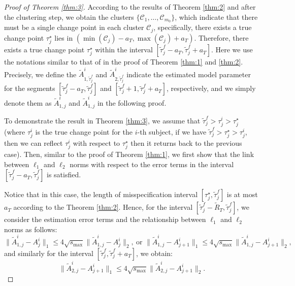 \documentclass[11pt]{article}
\begin{document}
\begin{proof}[Proof of Theorem \ref{thm:3}]
According to the results of Theorem \ref{thm:2} and after the clustering step, we obtain the clusters $\{\mathcal{C}_1, \dots, \mathcal{C}_{m_0}\}$, which indicate that there must be a single change point in each cluster $\mathcal{C}_j$, specifically, there exists a true change point $\tau_j^\star$ lies in $(\min(\mathcal{C}_j) -a_T, \max(\mathcal{C}_j) + a_T)$. Therefore, there exists a true change point $\tau_j^\star$ within the interval $[\widetilde{\tau}_j^f - a_T, \widetilde{\tau}_j^f+a_T]$. Here we use the notations similar to that of in the proof of Theorem \ref{thm:1} and \ref{thm:2}. Precisely, we define the $\widetilde{A}^i_{1,\widetilde{\tau}^f_j}$ and $\widetilde{A}^i_{2,\widetilde{\tau}^f_j}$ indicate the estimated model parameter for the segments $[\widetilde{\tau}^{f}_j-a_T, \widetilde{\tau}^{f}_j]$ and $[\widetilde{\tau}^{f}_j+1, \widetilde{\tau}^{f}_j+a_T]$, respectively, and we simply denote them as $\widetilde{A}^i_{1,j}$ and $\widetilde{A}^i_{1,j}$ in the following proof.

To demonstrate the result in Theorem \ref{thm:3}, we assume that $\widetilde{\tau}_j^f > \tau_j^i > \tau_j^\star$ (where $\tau_j^i$ is the true change point for the $i$-th subject, if we have $\widetilde{\tau}^f_j > \tau_j^\star > \tau_j^i$, then we can reflect $\tau_j^i$ with respect to $\tau_j^\star$ then it returns back to the previous case). Then, similar to the proof of Theorem \ref{thm:1}, we first show that the link between $\ell_1$ and $\ell_2$ norms with respect to the error terms in the interval $[\widetilde{\tau}_j^f-a_T, \widetilde{\tau}_j^f]$ is satisfied.

Notice that in this case, the length of misspecification interval $[\tau^\star_j, \widetilde{\tau}^f_j]$ is at most $a_T$ according to the Theorem \ref{thm:2}. Hence, for the interval $[\widetilde{\tau}^f_j - \widetilde{R}_T, \widetilde{\tau}^f_j]$, we consider the estimation error terms and the relationship between $\ell_1$ and $\ell_2$ norms as follows:
\begin{equation}
    \label{eq:48}
    \|\widetilde{A}^i_{1,j} - A_j^i\|_1 \leq 4\sqrt{s_{\max}}\|\widetilde{A}^i_{1,j} - A_j^i\|_2,\ \text{or } \|\widetilde{A}^i_{1,j} - A_{j+1}^i\|_1 \leq 4\sqrt{s_{\max}}\|\widetilde{A}^i_{1,j} - A_{j+1}^i\|_2,
\end{equation}
and similarly for the interval $[\widetilde{\tau}_j^f, \widetilde{\tau}_j^f+a_T]$, we obtain:
\begin{equation}
    \label{eq:49}
    \|\widetilde{A}^i_{2,j} - A_{j+1}^i\|_1 \leq 4\sqrt{s_{\max}}\|\widetilde{A}^i_{2,j} - A_{j+1}^i\|_2.
\end{equation}


\end{proof}
\end{document}
